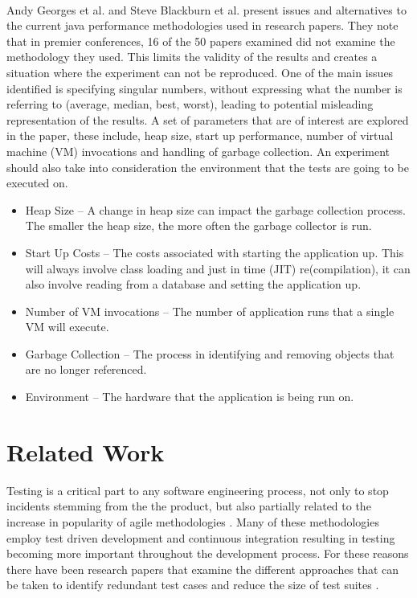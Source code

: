 \paragraph{}
Andy Georges et al. \cite{georges2007statistically} and Steve Blackburn et al. \cite{blackburn2008wake} present issues and alternatives to the current java performance methodologies used in research papers. They note that in premier conferences, 16 of the 50 papers examined did not examine the methodology they used. This limits the validity of the results and creates a situation where the experiment can not be reproduced. One of the main issues identified is specifying singular numbers, without expressing what the number is referring to (average, median, best, worst), leading to potential misleading representation of the results. A set of parameters that are of interest are explored in the paper, these include, heap size, start up performance, number of virtual machine (VM) invocations and handling of garbage collection. An experiment should also take into consideration the environment that the tests are going to be executed on.
\begin{itemize}
\item Heap Size -- A change in heap size can impact the garbage collection process. The smaller the heap size, the more often the garbage collector is run.
\item Start Up Costs  -- The costs associated with starting the application up. This will always involve class loading and just in time (JIT) re(compilation), it can also involve reading from a database and setting the application up.
\item Number of VM invocations -- The number of application runs that a single VM will execute.
\item Garbage Collection -- The process in identifying and removing objects that are no longer referenced.
\item Environment -- The hardware that the application is being run on.
\end{itemize}

\section{Related Work}
\label{relatedworkRef}
Testing is a critical part to any software engineering process, not only to stop incidents stemming from the the product, but also partially related to the increase in popularity of agile methodologies \cite{chaos}. Many of these methodologies employ test driven development and continuous integration resulting in testing becoming more important throughout the development process. For these reasons there have been research papers that examine the different approaches that can be taken to identify redundant test cases and reduce the size of test suites \cite{wong1995effect, wong1999test, rothermel1998empirical, rothermel2002empirical,koochakzadeh2009test,zhang2011empirical,li2008static}.
